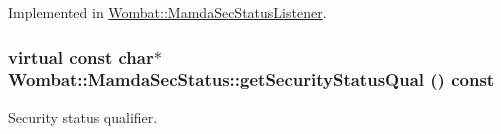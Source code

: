 Implemented in \hyperlink{classWombat_1_1MamdaSecStatusListener_f5a0928dfb229b6c39fd64c07628d37a}{Wombat::Mamda\-Sec\-Status\-Listener}.\hypertarget{classWombat_1_1MamdaSecStatus_c75f88870e36e581ef460d88c0fa4719}{
\subsubsection[getSecurityStatusQual]{\setlength{\rightskip}{0pt plus 5cm}virtual const char$\ast$ Wombat::Mamda\-Sec\-Status::get\-Security\-Status\-Qual () const}}
\label{classWombat_1_1MamdaSecStatus_c75f88870e36e581ef460d88c0fa4719}


Security status qualifier. 

